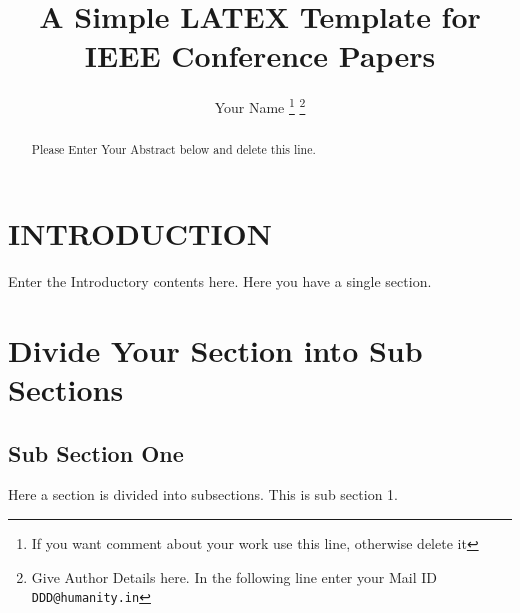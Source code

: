 \documentclass[a4paper, 10pt, conference]{ieeeconf}      %
\title{\LARGE \bf A Simple LATEX Template for IEEE Conference Papers}
\author{Your Name
\thanks{If you want comment about your work use this line, otherwise delete it}
\thanks{Give Author Details here. In the following line enter your Mail ID 
                  {\tt\small DDD@humanity.in}}
}
\begin{document}
\maketitle
\thispagestyle{empty}
\pagestyle{empty}



\begin{abstract}

Please Enter Your Abstract below and delete this line.


\end{abstract}



\section{INTRODUCTION}

Enter the Introductory contents here. Here you have a single section.


\section{Divide Your Section into Sub Sections}
\subsection{Sub Section One}

Here a section is divided into subsections. This is sub section 1. 

\end{document}
